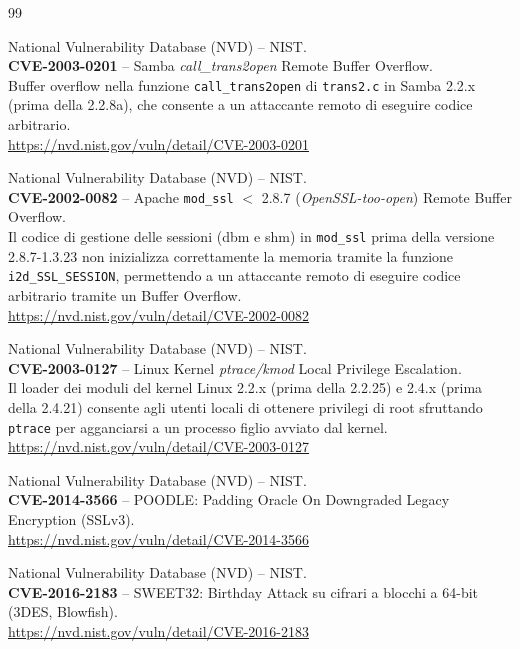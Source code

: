 \documentclass[12pt, a4paper]{article}
\begin{document}
	\begin{thebibliography}{99}

	National Vulnerability Database (NVD) -- NIST.\\
	\textbf{CVE-2003-0201} -- Samba \textit{call\_trans2open} Remote Buffer Overflow.\\
	Buffer overflow nella funzione \texttt{call\_trans2open} di \texttt{trans2.c} in Samba 2.2.x
	(prima della 2.2.8a), che consente a un attaccante remoto di eseguire codice arbitrario.\\
	\url{https://nvd.nist.gov/vuln/detail/CVE-2003-0201}



	National Vulnerability Database (NVD) -- NIST.\\
	\textbf{CVE-2002-0082} -- Apache \texttt{mod\_ssl} $<$ 2.8.7 (\textit{OpenSSL-too-open}) Remote Buffer Overflow.\\
	Il codice di gestione delle sessioni (dbm e shm) in \texttt{mod\_ssl} prima della versione 2.8.7-1.3.23
	non inizializza correttamente la memoria tramite la funzione \texttt{i2d\_SSL\_SESSION},
	permettendo a un attaccante remoto di eseguire codice arbitrario tramite un Buffer Overflow.\\
	\url{https://nvd.nist.gov/vuln/detail/CVE-2002-0082}



	National Vulnerability Database (NVD) -- NIST.\\
	\textbf{CVE-2003-0127} -- Linux Kernel \textit{ptrace/kmod} Local Privilege Escalation.\\
	Il loader dei moduli del kernel Linux 2.2.x (prima della 2.2.25) e 2.4.x (prima della 2.4.21)
	consente agli utenti locali di ottenere privilegi di root sfruttando \texttt{ptrace} per agganciarsi
	a un processo figlio avviato dal kernel.\\

	\url{https://nvd.nist.gov/vuln/detail/CVE-2003-0127}

	National Vulnerability Database (NVD) -- NIST.\\
	\textbf{CVE-2014-3566} -- POODLE: Padding Oracle On Downgraded Legacy Encryption (SSLv3).\\
	\url{https://nvd.nist.gov/vuln/detail/CVE-2014-3566}



	National Vulnerability Database (NVD) -- NIST.\\
	\textbf{CVE-2016-2183} -- SWEET32: Birthday Attack su cifrari a blocchi a 64-bit (3DES, Blowfish).\\
	\url{https://nvd.nist.gov/vuln/detail/CVE-2016-2183}




\end{thebibliography}
\end{document}
